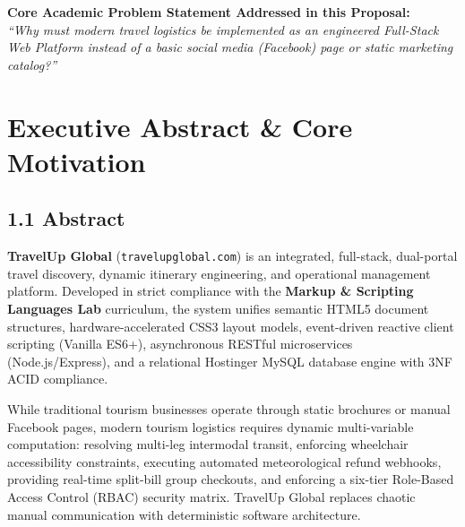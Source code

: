 \documentclass[11pt,a4paper]{article}
\begin{document}
\begin{titlepage}
    \vfill
    \begin{tcolorbox}[colback=boxgray,colframe=primary,arc=2mm,boxrule=0.8pt]
    \centering\footnotesize\textcolor{secondary}{
    \textbf{Core Academic Problem Statement Addressed in this Proposal:}\\
    \textit{``Why must modern travel logistics be implemented as an engineered Full-Stack Web Platform instead of a basic social media (Facebook) page or static marketing catalog?''}
    }
    \end{tcolorbox}
    \vspace*{0.1cm}
\end{titlepage}

\newpage

\section{Executive Abstract \& Core Motivation}

\subsection{1.1 Abstract}
\textbf{TravelUp Global} (\texttt{travelupglobal.com}) is an integrated, full-stack, dual-portal travel discovery, dynamic itinerary engineering, and operational management platform. Developed in strict compliance with the \textbf{Markup \& Scripting Languages Lab} curriculum, the system unifies semantic HTML5 document structures, hardware-accelerated CSS3 layout models, event-driven reactive client scripting (Vanilla ES6+), asynchronous RESTful microservices (Node.js/Express), and a relational Hostinger MySQL database engine with 3NF ACID compliance.

While traditional tourism businesses operate through static brochures or manual Facebook pages, modern tourism logistics requires dynamic multi-variable computation: resolving multi-leg intermodal transit, enforcing wheelchair accessibility constraints, executing automated meteorological refund webhooks, providing real-time split-bill group checkouts, and enforcing a six-tier Role-Based Access Control (RBAC) security matrix. TravelUp Global replaces chaotic manual communication with deterministic software architecture.
\end{document}
